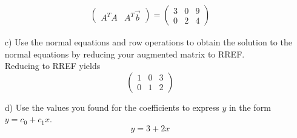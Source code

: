 \begin{enumerate}
{    \begin{align}
        \begin{pmatrix} A^TA & A^T\vec b \end{pmatrix} 
        = \begin{pmatrix} 3&0&9\\0&2&4\end{pmatrix}
    \end{align}
    } 
    \else 
    \vfill
    \fi
    \item[c)] Use the normal equations and row operations to obtain the solution to the normal equations by reducing your augmented matrix to RREF. 
    \ifnum {} {\color{DarkBlue} \\[12pt] 
    Reducing to RREF yields 
    $$\begin{pmatrix} 1&0&3\\0&1&2\end{pmatrix}$$
    } 
    \else 
    \vspace{3cm}
    \fi
    \item[d)] Use the values you found for the coefficients to express $y$ in the form $y = c_0 + c_1x$. 
    \ifnum {} {\color{DarkBlue} \\[12pt] 
    $$y = 3 + 2x$$
    } 
    \else 
    \vspace{3cm}
    \fi
\end{enumerate}
\fi 


